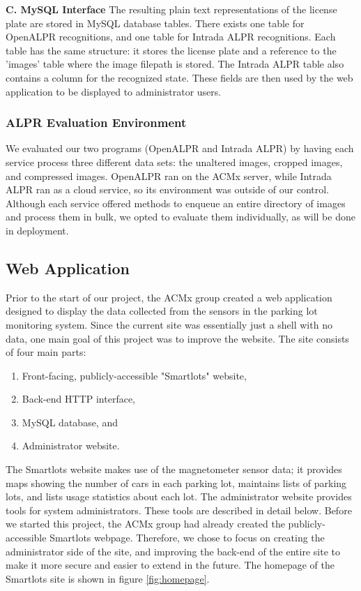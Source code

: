 \documentclass[11pt, oneside, fullpage, doublespace]{article}
\begin{document}
\textbf{C. MySQL Interface}
The resulting plain text representations of the license plate are stored in MySQL database tables. There exists one table for OpenALPR recognitions, and one table for Intrada ALPR recognitions. Each table has the same structure: it stores the license plate and a reference to the 'images' table where the image filepath is stored. The Intrada ALPR table also contains a column for the recognized state. These fields are then used by the web application to be displayed to administrator users.

\subsubsection{ALPR Evaluation Environment}
We evaluated our two programs (OpenALPR and Intrada ALPR) by having each service process three different data sets: the unaltered images, cropped images, and compressed images. OpenALPR ran on the ACMx server, while Intrada ALPR ran as a cloud service, so its environment was outside of our control. Although each service offered methods to enqueue an entire directory of images and process them in bulk, we opted to evaluate them individually, as will be done in deployment.

\subsection{Web Application}

Prior to the start of our project, the ACMx group created a web application designed to display the data collected from the sensors in the parking lot monitoring system. Since the current site was essentially just a shell with no data, one main goal of this project was to improve the website. The site consists of four main parts:

\begin{enumerate}
\item Front-facing, publicly-accessible "Smartlots" website,
\item Back-end HTTP interface,
\item MySQL database, and
\item Administrator website.
\end{enumerate}

The Smartlots website makes use of the magnetometer sensor data; it provides maps showing the number of cars in each parking lot, maintains lists of parking lots, and lists usage statistics about each lot. The administrator website provides tools for system administrators. These tools are described in detail below. Before we started this project, the ACMx group had already created the publicly-accessible Smartlots webpage. Therefore, we chose to focus on creating the administrator side of the site, and improving the back-end of the entire site to make it more secure and easier to extend in the future. The homepage of the Smartlots site is shown in figure \ref{fig:homepage}.
\end{document}
